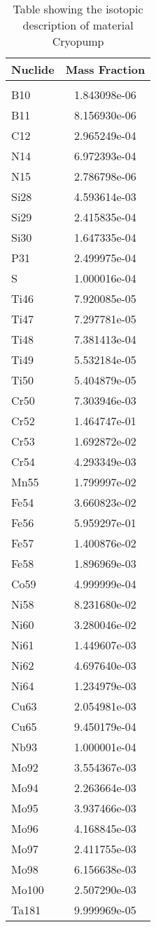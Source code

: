 \begin{centering}
\begin{table}[ht!]
\begin{tabular}{l | c}
\hline
Nuclide & Mass Fraction\\
\hline
\\
B10 & 1.843098e-06\\
B11 & 8.156930e-06\\
C12 & 2.965249e-04\\
N14 & 6.972393e-04\\
N15 & 2.786798e-06\\
Si28 & 4.593614e-03\\
Si29 & 2.415835e-04\\
Si30 & 1.647335e-04\\
P31 & 2.499975e-04\\
S & 1.000016e-04\\
Ti46 & 7.920085e-05\\
Ti47 & 7.297781e-05\\
Ti48 & 7.381413e-04\\
Ti49 & 5.532184e-05\\
Ti50 & 5.404879e-05\\
Cr50 & 7.303946e-03\\
Cr52 & 1.464747e-01\\
Cr53 & 1.692872e-02\\
Cr54 & 4.293349e-03\\
Mn55 & 1.799997e-02\\
Fe54 & 3.660823e-02\\
Fe56 & 5.959297e-01\\
Fe57 & 1.400876e-02\\
Fe58 & 1.896969e-03\\
Co59 & 4.999999e-04\\
Ni58 & 8.231680e-02\\
Ni60 & 3.280046e-02\\
Ni61 & 1.449607e-03\\
Ni62 & 4.697640e-03\\
Ni64 & 1.234979e-03\\
Cu63 & 2.054981e-03\\
Cu65 & 9.450179e-04\\
Nb93 & 1.000001e-04\\
Mo92 & 3.554367e-03\\
Mo94 & 2.263664e-03\\
Mo95 & 3.937466e-03\\
Mo96 & 4.168845e-03\\
Mo97 & 2.411755e-03\\
Mo98 & 6.156638e-03\\
Mo100 & 2.507290e-03\\
Ta181 & 9.999969e-05
\end{tabular}
\caption{Table showing the isotopic description of material Cryopump}
\label{table:material_Cryopump}
\end{table}\clearpage


\end{centering}
